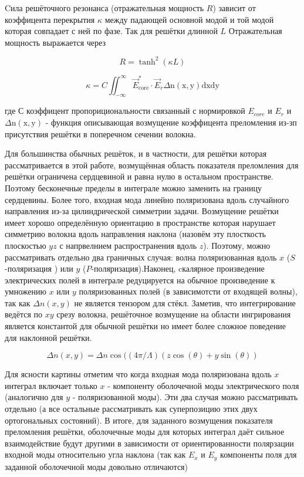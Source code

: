 \par
Cила решёточного резонанса (отражательная мощность $ R $) зависит от коэффицента перекрытия $ \kappa $ между 
падающей основной модой и той модой которая совпадает с ней по фазе.
Так для решётки длинной $ L $ Отражательная мощность выражается через




$$R=\tanh ^{2}(\kappa L)$$


$$\kappa=C \iint_{-\infty}^{\infty} \vec{E}_{\mathrm{core}}^{*} \cdot \vec{E}_{r} \Delta \mathrm{n}(\mathrm{x}, \mathrm{y}) \mathrm{d} \mathrm{xdy}$$


где $ С $ коэффицент пропорициональности связанный с нормировкой $ E_{core} $ и $ E_{r}$ и  $\Delta \mathrm{n}(\mathrm{x}, \mathrm{y})$ - функция описывающая возмущение коэффицента преломления из-зп присутствия решётки в поперечном сечении волокна.


Для большинства обычных решёток, и в частности, для решётки которая рассматривается в этой работе, возмущённая область показателя преломления для решётки ограничена сердцевиной и равна нулю в остальном пространстве. Поэтому бесконечные пределы в интеграле можно заменить на границу сердцевины.
Более того, входная мода линейно поляризована вдоль случайного направления
из-за цилиндрической симметрии задачи. Возмущение решётки имеет хорошо определённую ориентацию в пространстве которая нарушает симметрию волокна вдоль направления наклона (назовём эту плосткость плоскостью $yz$  с напрвелнием распространения вдоль $ z $). Поэтому, можно рассматривать отдельно два граничных случая: волна поляризованная вдоль $ x $  ($ S $-поляризация ) или $ y $ ($ P $-поляризация).Наконец, cкалярное произведение электрических полей в интеграле редуцируется на обычное произведение к умножению $ x $ или $ y $ поляризованных полей (в зависимотсти от входящей волны), так как $\Delta n(x , y)$ не является тензором для стёкл. Заметив, что интегрирование ведётся по $ xy $ срезу волокна, решёточное возмущение на области ингрирования является константой для обычной решётки но имеет более сложное поведение для наклонной решётки.

$$\Delta n(x, y)=\Delta n \cos ((4 \pi / \Lambda)(z \cos (\theta)+y \sin (\theta))$$

Для ясности картины отметим что когда входная мода поляризована вдоль $ x $
интеграл включает только $ x $ - компоненту оболочечной моды электрического поля (аналогично для $ y $ - поляризованной моды). Эти два случая можно рассматривать отдельно (а все остальные рассматривать как суперпозицию этих двух ортогональных состояний). В итоге, для заданного возмущения показателя преломления решётки, оболочечные моды для которых интеграл даёт сильное взаимодействие будут другими в зависимости от ориентированности полярзации входной моды относительно угла наклона (так как $ E_x $ и $ E_y $ компоненты поля для заданной оболочечной моды довольно отличаются)
 
